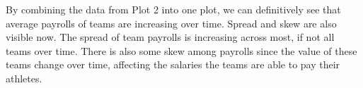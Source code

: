 \documentclass[]{article}
\begin{document}
By combining the data from Plot 2 into one plot, we can definitively see
that average payrolls of teams are increasing over time. Spread and skew
are also visible now. The spread of team payrolls is increasing across
most, if not all teams over time. There is also some skew among payrolls
since the value of these teams change over time, affecting the salaries
the teams are able to pay their athletes.
\end{document}
